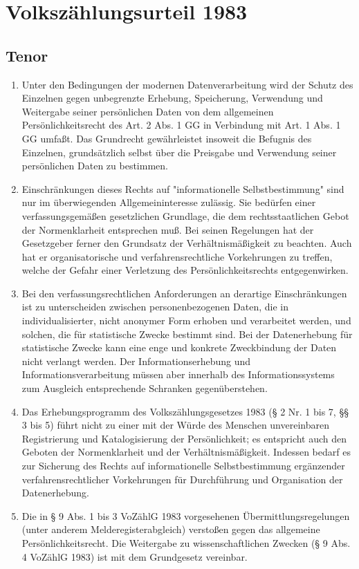 \chapter{Volkszählungsurteil 1983}


    \section{Tenor}
        \begin{enumerate}
            \item Unter den Bedingungen der modernen Datenverarbeitung wird der Schutz des Einzelnen gegen unbegrenzte Erhebung, Speicherung, Verwendung und Weitergabe seiner persönlichen Daten von dem allgemeinen Persönlichkeitsrecht des Art. 2 Abs. 1 GG in Verbindung mit Art. 1 Abs. 1 GG umfaßt. Das Grundrecht gewährleistet insoweit die Befugnis des Einzelnen, grundsätzlich selbst über die Preisgabe und Verwendung seiner persönlichen Daten zu bestimmen.
            \item Einschränkungen dieses Rechts auf "informationelle Selbstbestimmung" sind nur im überwiegenden Allgemeininteresse zulässig. Sie bedürfen einer verfassungsgemäßen gesetzlichen Grundlage, die dem rechtsstaatlichen Gebot der Normenklarheit entsprechen muß. Bei seinen Regelungen hat der Gesetzgeber ferner den Grundsatz der Verhältnismäßigkeit zu beachten. Auch hat er organisatorische und verfahrensrechtliche Vorkehrungen zu treffen, welche der Gefahr einer Verletzung des Persönlichkeitsrechts entgegenwirken.     \item Bei den verfassungsrechtlichen Anforderungen an derartige Einschränkungen ist zu unterscheiden zwischen personenbezogenen Daten, die in individualisierter, nicht anonymer Form erhoben und verarbeitet werden, und solchen, die für statistische Zwecke bestimmt sind. Bei der Datenerhebung für statistische Zwecke kann eine enge und konkrete Zweckbindung der Daten nicht verlangt werden. Der Informationserhebung und Informationsverarbeitung müssen aber innerhalb des Informationssystems zum Ausgleich entsprechende Schranken gegenüberstehen.
            \item Das Erhebungsprogramm des Volkszählungsgesetzes 1983 (§ 2 Nr. 1 bis 7, §§ 3 bis 5) führt nicht zu einer mit der Würde des Menschen unvereinbaren Registrierung und Katalogisierung der Persönlichkeit; es entspricht auch den Geboten der Normenklarheit und der Verhältnismäßigkeit. Indessen bedarf es zur Sicherung des Rechts auf informationelle Selbstbestimmung ergänzender verfahrensrechtlicher Vorkehrungen für Durchführung und Organisation der Datenerhebung. 
            \item Die in § 9 Abs. 1 bis 3 VoZählG 1983 vorgesehenen Übermittlungsregelungen (unter anderem Melderegisterabgleich) verstoßen gegen das allgemeine Persönlichkeits\-recht. Die Weitergabe zu wissenschaftlichen Zwecken (§ 9 Abs. 4 VoZählG 1983) ist mit dem Grundgesetz vereinbar. 
        \end{enumerate}
